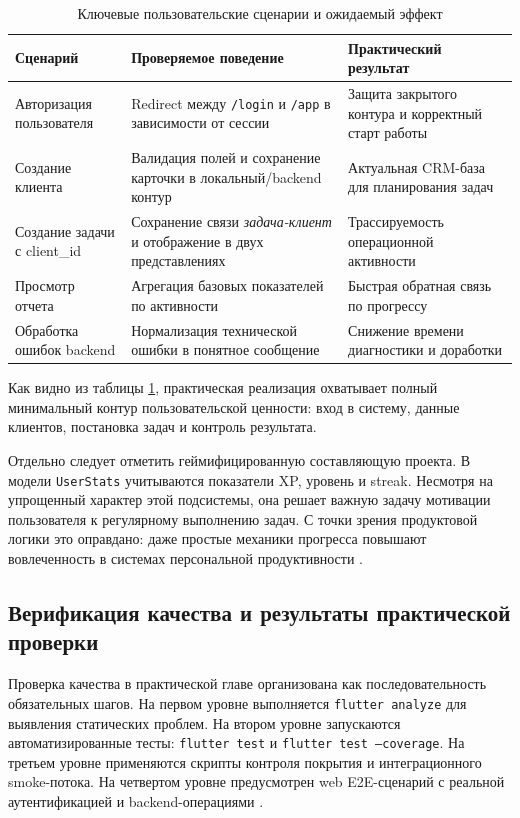 \begin{table}[h!]
\caption{Ключевые пользовательские сценарии и ожидаемый эффект}
\centering
\begin{tabular}{|p{4.5cm}|p{5.2cm}|p{4.5cm}|}
\hline
\textbf{Сценарий} & \textbf{Проверяемое поведение} & \textbf{Практический результат} \\
\hline
Авторизация пользователя & Redirect между \texttt{/login} и \texttt{/app} в зависимости от сессии & Защита закрытого контура и корректный старт работы \\
\hline
Создание клиента & Валидация полей и сохранение карточки в локальный/backend контур & Актуальная CRM-база для планирования задач \\
\hline
Создание задачи с client\_id & Сохранение связи \textit{задача-клиент} и отображение в двух представлениях & Трассируемость операционной активности \\
\hline
Просмотр отчета & Агрегация базовых показателей по активности & Быстрая обратная связь по прогрессу \\
\hline
Обработка ошибок backend & Нормализация технической ошибки в понятное сообщение & Снижение времени диагностики и доработки \\
\hline
\end{tabular}
\label{tab:scenarios}
\end{table}

Как видно из таблицы \ref{tab:scenarios}, практическая реализация охватывает полный минимальный контур пользовательской ценности: вход в систему, данные клиентов, постановка задач и контроль результата.

Отдельно следует отметить геймифицированную составляющую проекта. В модели \texttt{UserStats} учитываются показатели XP, уровень и streak. Несмотря на упрощенный характер этой подсистемы, она решает важную задачу мотивации пользователя к регулярному выполнению задач. С точки зрения продуктовой логики это оправдано: даже простые механики прогресса повышают вовлеченность в системах персональной продуктивности \cite{productivityBook}.

\subsection{Верификация качества и результаты практической проверки}

Проверка качества в практической главе организована как последовательность обязательных шагов. На первом уровне выполняется \texttt{flutter analyze} для выявления статических проблем. На втором уровне запускаются автоматизированные тесты: \texttt{flutter test} и \texttt{flutter test --coverage}. На третьем уровне применяются скрипты контроля покрытия и интеграционного smoke-потока. На четвертом уровне предусмотрен web E2E-сценарий с реальной аутентификацией и backend-операциями \cite{repoReadme}.

